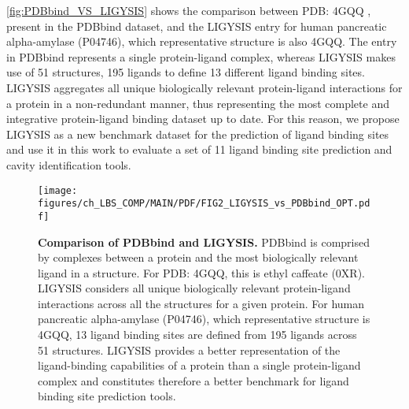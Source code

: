 \FloatBarrier


\autoref{fig:PDBbind_VS_LIGYSIS} shows the comparison between PDB: 4GQQ \cite{WILLIAMS_2012_AMYLASE}, present in the PDBbind dataset, and the LIGYSIS entry for human pancreatic alpha-amylase (P04746), which representative structure is also 4GQQ. The entry in PDBbind represents a single protein-ligand complex, whereas LIGYSIS makes use of 51 structures, 195 ligands to define 13 different ligand binding sites. LIGYSIS aggregates all unique biologically relevant protein-ligand interactions for a protein in a non-redundant manner, thus representing the most complete and integrative protein-ligand binding dataset up to date. For this reason, we propose LIGYSIS as a new benchmark dataset for the prediction of ligand binding sites and use it in this work to evaluate a set of 11 ligand binding site prediction and cavity identification tools.

\begin{figure}[htb!]
    \centering
    \texttt{[image: figures/ch\_LBS\_COMP/MAIN/PDF/FIG2\_LIGYSIS\_vs\_PDBbind\_OPT.pdf]}
    \caption[Comparison of PDBbind and LIGYSIS]{\textbf{Comparison of PDBbind and LIGYSIS.} PDBbind is comprised by complexes between a protein and the most biologically relevant ligand in a structure. For PDB: 4GQQ, this is ethyl caffeate (0XR). LIGYSIS considers all unique biologically relevant protein-ligand interactions across all the structures for a given protein. For human pancreatic alpha-amylase (P04746), which representative structure is 4GQQ, 13 ligand binding sites are defined from 195 ligands across 51 structures. LIGYSIS provides a better representation of the ligand-binding capabilities of a protein than a single protein-ligand complex and constitutes therefore a better benchmark for ligand binding site prediction tools.}
    \label{fig:PDBbind_VS_LIGYSIS}
\end{figure}

